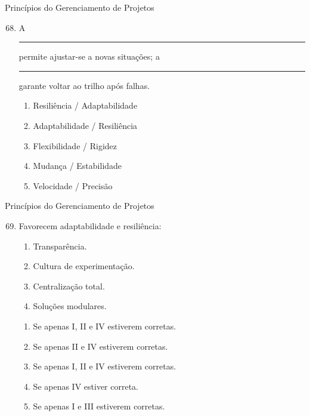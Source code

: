 \documentclass{beamer}
\begin{document}
\begin{frame}{Princípios do Gerenciamento de Projetos}
	\begin{enumerate}
		\setcounter{enumi}{67}
		\justifying
		\item A \rule{50pt}{0.75pt} permite ajustar-se a novas situações; a \rule{50pt}{0.75pt} garante voltar ao trilho após falhas.
		\begin{enumerate}[a]
			\item Resiliência / Adaptabilidade
			\item \alert<2>{Adaptabilidade / Resiliência}
			\item Flexibilidade / Rigidez
			\item Mudança / Estabilidade
			\item Velocidade / Precisão
		\end{enumerate}
	\end{enumerate}
\end{frame}

\begin{frame}{Princípios do Gerenciamento de Projetos}
	\begin{enumerate}
		\setcounter{enumi}{68}
		\justifying
		\item Favorecem adaptabilidade e resiliência:
		\begin{enumerate}[I]
			\item Transparência.
			\item Cultura de experimentação.
			\item Centralização total.
			\item Soluções modulares.
		\end{enumerate}
		\begin{enumerate}[a]
			\item Se apenas I, II e IV estiverem corretas.
			\item Se apenas II e IV estiverem corretas.
			\item \alert<2>{Se apenas I, II e IV estiverem corretas.}
			\item Se apenas IV estiver correta.
			\item Se apenas I e III estiverem corretas.
		\end{enumerate}
	\end{enumerate}
\end{frame}
\end{document}
